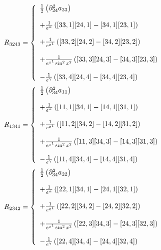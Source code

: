 \begin{align}
R_{3243}&= \left\{\begin{array}{l}
\frac{1}{2}\left(\partial^2_{24} a_{33}\right)\\\\
+ \frac{1}{e^{\alpha}}\left( [33,1] [24,1] -[34,1] [23,1]  \right)\\\\
+ \frac{1}{e^{x^1}}\left( [33,2] [24,2] -[34,2] [23,2]  \right)\\\\
+ \frac{1}{e^{x^1}\sin^2 x^2}\left( [33,3] [24,3] -[34,3] [23,3]  \right)\\\\
-\frac{1}{e^{\gamma}}\left( [33,4] [24,4] -[34,4] [23,4]  \right)
\end {array}\right.\\
\end{align}
\begin{align}
R_{1341}&= \left\{\begin{array}{l}
\frac{1}{2}\left(\partial^2_{34} a_{11}\right)\\\\
+ \frac{1}{e^{\alpha}}\left( [11,1] [34,1] -[14,1] [31,1]  \right)\\\\
+ \frac{1}{e^{x^1}}\left( [11,2] [34,2] -[14,2] [31,2]  \right)\\\\
+ \frac{1}{e^{x^1}\sin^2 x^2}\left( [11,3] [34,3] -[14,3] [31,3]  \right)\\\\
-\frac{1}{e^{\gamma}}\left( [11,4] [34,4] -[14,4] [31,4]  \right)
\end {array}\right.\\
\end{align}
\begin{align}
R_{2342}&= \left\{\begin{array}{l}
\frac{1}{2}\left(\partial^2_{34} a_{22}\right)\\\\
+ \frac{1}{e^{\alpha}}\left( [22,1] [34,1] -[24,1] [32,1]  \right)\\\\
+ \frac{1}{e^{x^1}}\left( [22,2] [34,2] -[24,2] [32,2]  \right)\\\\
+ \frac{1}{e^{x^1}\sin^2 x^2}\left( [22,3] [34,3] -[24,3] [32,3]  \right)\\\\
-\frac{1}{e^{\gamma}}\left( [22,4] [34,4] -[24,4] [32,4]  \right)
\end {array}\right.\\
\end{align}
